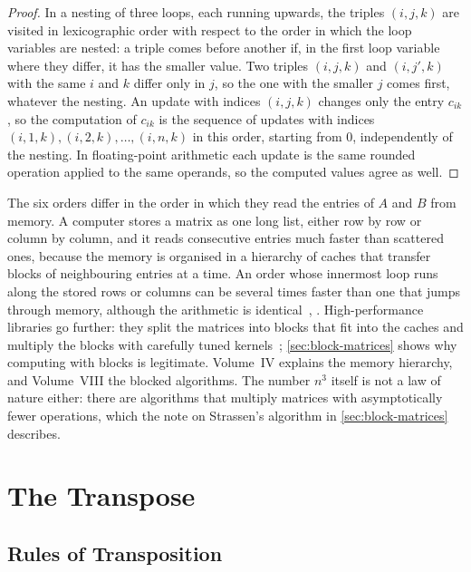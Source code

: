 \begin{proof}
In a nesting of three loops, each running upwards, the triples $(i,j,k)$ are visited in lexicographic order with respect to the order in which the loop variables are nested: a triple comes before another if, in the first loop variable where they differ, it has the smaller value. Two triples $(i,j,k)$ and $(i,j',k)$ with the same $i$ and $k$ differ only in $j$, so the one with the smaller $j$ comes first, whatever the nesting. An update with indices $(i,j,k)$ changes only the entry $c_{ik}$, so the computation of $c_{ik}$ is the sequence of updates with indices $(i,1,k),(i,2,k),\ldots,(i,n,k)$ in this order, starting from $0$, independently of the nesting. In floating-point arithmetic each update is the same rounded operation applied to the same operands, so the computed values agree as well.
\end{proof}

The six orders differ in the order in which they read the entries of $A$ and $B$ from memory. A computer stores a matrix as one long list, either row by row or column by column, and it reads consecutive entries much faster than scattered ones, because the memory is organised in a hierarchy of caches that transfer blocks of neighbouring entries at a time. An order whose innermost loop runs along the stored rows or columns can be several times faster than one that jumps through memory, although the arithmetic is identical~\cite{dongarra1984}, \cite[Sect.~1.1]{golub2013}. High-performance libraries go further: they split the matrices into blocks that fit into the caches and multiply the blocks with carefully tuned kernels~\cite{goto2008}; \cref{sec:block-matrices} shows why computing with blocks is legitimate. Volume~IV explains the memory hierarchy, and Volume~VIII the blocked algorithms. The number $n^3$ itself is not a law of nature either: there are algorithms that multiply matrices with asymptotically fewer operations, which the note on Strassen's algorithm in \cref{sec:block-matrices} describes.

\section{The Transpose}
\label{sec:transpose}

\subsection{Rules of Transposition}

